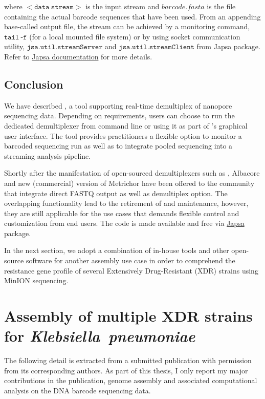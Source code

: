 where $\mathtt{<data \: stream>}$ is the input stream and $\mathit{barcode.fasta}$ is the file containing the actual barcode sequences that have been used.
From an appending base-called output file, the stream can be achieved by a monitoring command, \EG{} $\mathtt{tail}\ \text{-}\mathtt{f}$ (for a local mounted file system) or by using socket communication utility, \EG{} $\mathtt{jsa.util.streamServer}$ and $\mathtt{jsa.util.streamClient}$ from Japsa package.
Refer to \href{http://japsa.readthedocs.org/en/latest/index.html}{Japsa documentation} for more details.

\subsection{Conclusion}

We have described \npbarcode{}, a tool supporting real-time demultiplex of nanopore sequencing data. 
Depending on requirements, users can choose to run the dedicated demultiplexer from command line or using it as part of \npreader's graphical user interface. 
The tool provides practitioners a flexible option to monitor a barcoded sequencing run as well as to integrate pooled sequencing into a streaming analysis pipeline.

Shortly after the manifestation of open-sourced demultiplexers such as \npbarcode{}, Albacore and new (commercial) version of Metrichor have been offered to the community that integrate direct FASTQ output as well as demultiplex option. The overlapping functionality lead to the retirement of \npreader{} and \npbarcode{} maintenance, however, they are still applicable for the use cases that demands flexible control and customization from end users. The code is made available and free via \href{https://github.com/mdcao/japsa}{Japsa} package.  

In the next section, we adopt a combination of in-house tools and other open-source software for another assembly use case in order to comprehend the resistance gene profile of several Extensively Drug-Resistant (XDR) \kp{} strains using MinION sequencing.

\section{Assembly of multiple XDR strains for \emph{Klebsiella~pneumoniae}} 
The following detail is extracted from a submitted publication with permission from its corresponding authors.
As part of this thesis, I only report my major contributions in the publication, \IE{} genome assembly and associated computational analysis on the DNA barcode sequencing data. 

